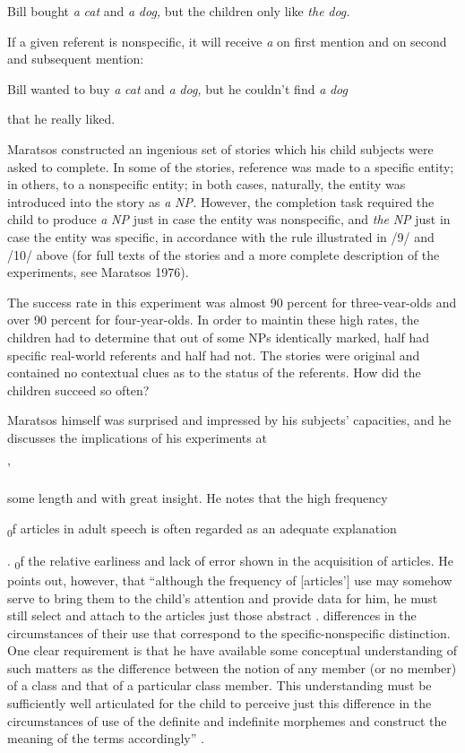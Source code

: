 \ea\label{ex:9}
 Bill bought \textit{a} \textit{cat} and \textit{a} \textit{dog,} but the children only like \textit{the} \textit{dog.}
\glt
\z

If a given referent is nonspecific, it will receive \textit{a} on first mention and on second and subsequent mention:

\ea\label{ex:10}
 Bill wanted to buy \textit{a} \textit{cat} and \textit{a} \textit{dog,} but he couldn't find \textit{a} \textit{dog}
\glt
\z

that he really liked.

Maratsos constructed an ingenious set of stories which his child subjects were asked to complete. In some of the stories, reference was made to a specific entity; in others, to a nonspecific entity; in both cases, naturally, the entity was introduced into the story as \textit{a} \textit{N}\textit{P.} However, the completion task required the child to produce \textit{a} \textit{NP} just in case the entity was nonspecific, and \textit{the} \textit{NP} just in case the entity was specific, in accordance with the rule illustrated in /9/ and /10/ above (for full texts of the stories and a more complete description of the experiments, see Maratsos 1976).

The success rate in this experiment was almost 90 percent for three-vear-olds and over 90 percent for four-year-olds. In order to maintin these high rates, the children had to determine that out of some NPs identically marked, half had specific real-world referents and half had not. The stories were original and contained no contextual clues as to the status of the referents. How did the children succeed so often?

Maratsos himself was surprised and impressed by his subjects' capacities, and he discusses the implications of his experiments at

'


some length and with great insight. He notes that the high frequency

\textsubscript{0}f articles in adult speech is often regarded as an adequate explanation

. \textsubscript{0}f the relative earliness and lack of error shown in the acquisition of articles. He points out, however, that ``although the frequency of [articles'] use may somehow serve to bring them to the child's atten\-tion and provide data for him, he must still select and attach to the articles just those abstract . differences in the circumstances of their use that correspond to the specific-nonspecific distinction. One clear requirement is that he have available some conceptual understanding of such matters as the difference between the notion of any member (or no member) of a class and that of a particular class member. This understanding must be sufficiently well articulated for the child to perceive just this difference in the circumstances of use of the definite and indefinite morphemes and construct the meaning of the terms accordingly'' \citep[453]{Maratsos1974}.

